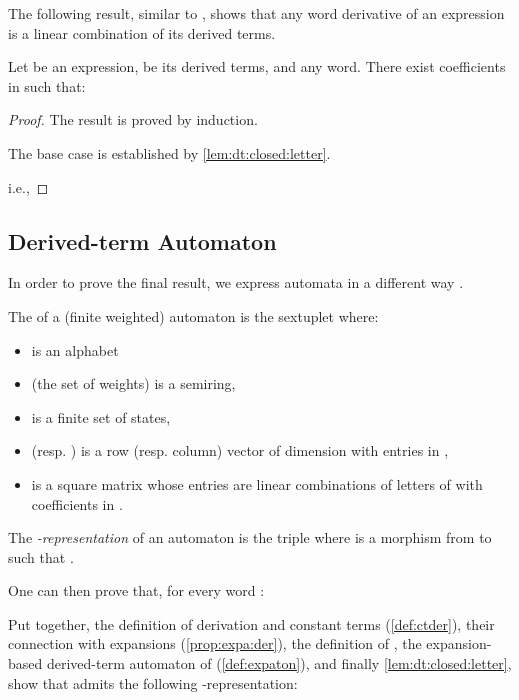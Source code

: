 \documentclass[a4paper,USenglish]{lipics}
\begin{document}
The following result, similar to \citep[Theorem~3]{lombardy.2005.tcs}, shows
that any word derivative of an expression is a linear combination of its
derived terms.
\begin{theorem}
  \label{thm:k}
  Let  be an expression,  be its
  derived terms, and  any word.  There exist coefficients
   in  such that:
  
\end{theorem}

\begin{proof}
  The result is proved by induction.

  The base case is established by \cref{lem:dt:closed:letter}.
  
  \noindent
  i.e.,
  
\end{proof}

\subsection{Derived-term Automaton}
\label{sec:dt-aut}
In order to prove the final result, we express automata in a different way
\citep[Sect.~5]{lombardy.2005.tcs}.

\begin{Definition}
  The  of a (finite weighted) automaton is the
  sextuplet  where:
  \begin{itemize}
  \item  is an alphabet
  \item  (the set of weights) is a semiring,
  \item  is a finite set of states,
  \item  (resp. ) is a row (resp. column) vector of dimension  with
    entries in ,
  \item  is a square matrix whose entries are linear combinations of
    letters of  with coefficients in .
  \end{itemize}

  \medskip

  The \emph{-representation} of an automaton is the triple
   where  is a morphism from  to
   such that .
\end{Definition}

One can then prove that, for every word :


Put together, the definition of derivation and constant terms
(\cref{def:ctder}), their connection with expansions (\cref{prop:expa:der}),
the definition of , the expansion-based derived-term automaton of
 (\cref{def:expaton}), and finally \cref{lem:dt:closed:letter}, show
that  admits the following -representation:
\end{document}
